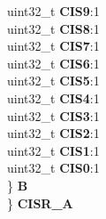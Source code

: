 \begin{DoxyCompactItemize}
\begin{tabbing}
\>\>uint32\_t {\bfseries CIS9}:1\\
\>\>uint32\_t {\bfseries CIS8}:1\\
\>\>uint32\_t {\bfseries CIS7}:1\\
\>\>uint32\_t {\bfseries CIS6}:1\\
\>\>uint32\_t {\bfseries CIS5}:1\\
\>\>uint32\_t {\bfseries CIS4}:1\\
\>\>uint32\_t {\bfseries CIS3}:1\\
\>\>uint32\_t {\bfseries CIS2}:1\\
\>\>uint32\_t {\bfseries CIS1}:1\\
\>\>uint32\_t {\bfseries CIS0}:1\\
\>\} {\bfseries B}\\
\} {\bfseries CISR\_A}\\


\end{tabbing}
\end{DoxyCompactItemize}
